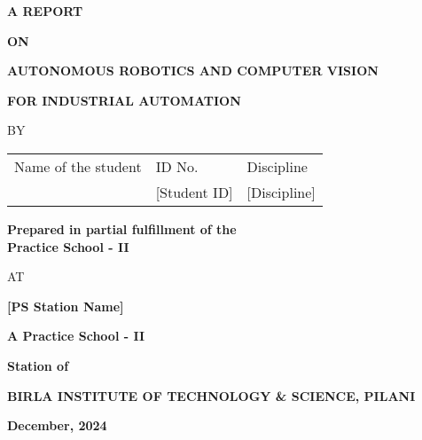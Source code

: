 \documentclass{book}
\begin{document}


\large

\thispagestyle{empty}
\centerline{\bf A REPORT}
\vspace*{0.3cm}
\centerline{\bf ON}
\vspace*{0.3cm}
\centerline{\bf AUTONOMOUS ROBOTICS AND COMPUTER VISION}
\centerline{\bf FOR INDUSTRIAL AUTOMATION}
\vspace*{2cm}

\centerline{BY}
\vspace*{1cm}

\begin{center}
	\begin{tabular}{lll}
		Name of the student & \hspace*{2cm} ID No. & \hspace*{2cm} Discipline \\ 
		[Student Name] &\hspace*{2cm} [Student ID] &\hspace*{2cm} [Discipline] \\
	\end{tabular}
\end{center}

\vspace*{2cm}
\begin{center}
	{\bf Prepared in partial fulfillment of the \\
	Practice School - II}
\end{center}

\vspace*{0.5cm}

\centerline{AT}

\vspace*{1cm}
        \centerline{\bf [PS Station Name]}
	\vspace{0.2cm}
	\centerline{\bf A Practice School - II}
	\vspace{0.2cm}
	\centerline{\bf Station of}
	\vspace{0.5cm}
\begin{figure}[ht]
\epsfxsize=1.0in
\centerline{}
\end{figure}

	\centerline{\bf BIRLA INSTITUTE OF TECHNOLOGY \& SCIENCE, PILANI}
	\vspace*{0.5cm}
	\centerline{\bf December, 2024}
	\newpage

\thispagestyle{empty}
\end{document}
